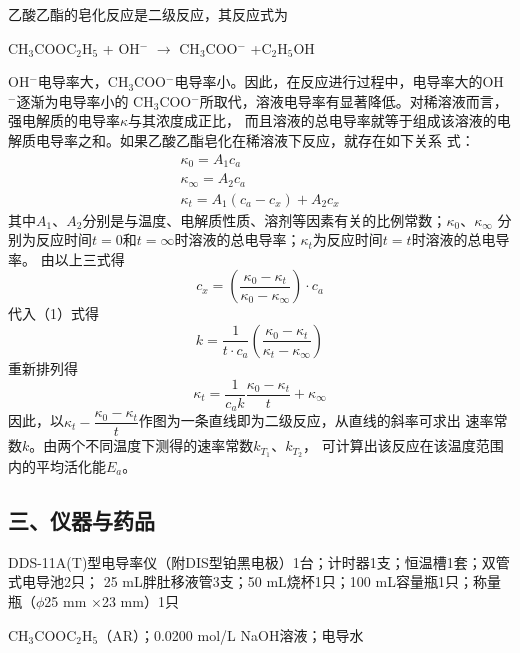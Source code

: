 \documentclass[a4paper]{ctexart}
\begin{document}
		乙酸乙酯的皂化反应是二级反应，其反应式为
		\begin{center}
			CH$_3$COOC$_2$H$_5$ + OH$^-$ $\longrightarrow$ CH$_3$COO$^-$ +C$_2$H$_5$OH
		\end{center}
		OH$^-$电导率大，CH$_3$COO$^-$电导率小。因此，在反应进行过程中，电导率大的OH$^-$逐渐为电导率小的
		CH$_3$COO$^-$所取代，溶液电导率有显著降低。对稀溶液而言，强电解质的电导率$\kappa$与其浓度成正比，
		而且溶液的总电导率就等于组成该溶液的电解质电导率之和。如果乙酸乙酯皂化在稀溶液下反应，就存在如下关系
		式：
		\begin{gather}
			\kappa_0=A_1c_a \\
			\kappa_\infty=A_2c_a \\
			\kappa_t=A_1\left(c_a-c_x\right)+A_2c_x
		\end{gather}
		其中$A_1$、$A_2$分别是与温度、电解质性质、溶剂等因素有关的比例常数；$\kappa_0$、$\kappa_\infty$
		分别为反应时间$t=0$和$t=\infty$时溶液的总电导率；$\kappa_t$为反应时间$t=t$时溶液的总电导率。
		由以上三式得
		\begin{equation}
			c_x=\left(\frac{\kappa_0-\kappa_t}{\kappa_0-\kappa_\infty}\right)\cdot c_a
		\end{equation}
		代入（1）式得
		\begin{equation}
			k=\frac{1}{t\cdot c_a}\left(\frac{\kappa_0-\kappa_t}{\kappa_t-\kappa_\infty}\right)
		\end{equation}
		重新排列得
		\begin{equation}
			\kappa_t=\frac{1}{c_ak}\frac{\kappa_0-\kappa_t}{t}+\kappa_\infty
		\end{equation}
		因此，以$\kappa_t-\dfrac{\kappa_0-\kappa_t}{t}$作图为一条直线即为二级反应，从直线的斜率可求出
		速率常数$k$。由两个不同温度下测得的速率常数$k_{T_1}$、$k_{T_2}$，
		可计算出该反应在该温度范围内的平均活化能$E_a$。
		
		
	\subsection*{三、仪器与药品}
		DDS-11A(T)型电导率仪（附DIS型铂黑电极）1台；计时器1支；恒温槽1套；双管式电导池2只；
		25 mL胖肚移液管3支；50 mL烧杯1只；100 mL容量瓶1只；称量瓶（$\phi$25 mm $\times$23 mm）1只
		
		CH$_3$COOC$_2$H$_5$（AR）；0.0200 mol/L NaOH溶液；电导水
		
		
\end{document}
